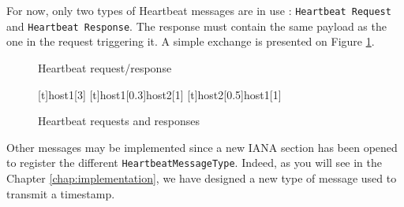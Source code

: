 For now, only two types of Heartbeat messages are in use : \texttt{Heartbeat Request} and \texttt{Heartbeat Response}. The response must contain the same payload as the one in the request triggering it. A simple exchange is presented on Figure \ref{fig:heartbeat}.

\begin{figure}[!h]
\centering
\begin{msc}[r]{Heartbeat request/response}

\setlength{\instfootheight}{0em}
\setlength{\instheadheight}{0em}
\setlength{\instdist}{0.7\linewidth}
\setlength{\levelheight}{3em}


[t]{}{host1}[3]
\nextlevel
{}[t]{host1}[0.3]{host2}[1]
\nextlevel
{}[t]{host2}[0.5]{host1}[1]
\nextlevel
\nextlevel
\end{msc}
\caption{Heartbeat requests and responses}
\label{fig:heartbeat}
\end{figure}

Other messages may be implemented since a new IANA section has been opened to register the different \texttt{HeartbeatMessageType}. Indeed, as you will see in the Chapter \ref{chap:implementation}, we have designed a new type of message used to transmit a timestamp.
